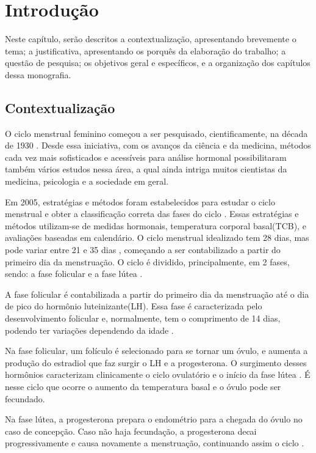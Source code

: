 \chapter[Introdução]{Introdução}
\label{ch:intro}

Neste capítulo, serão descritos a contextualização, apresentando brevemente o tema; a justificativa, 
apresentando os porquês da elaboração do trabalho; a questão de pesquisa; os objetivos geral e específicos, e a organização dos 
capítulos dessa monografia.

\section{Contextualização}

O ciclo menstrual feminino começou a ser pesquisado, cientificamente, na década de 1930 \cite{frank1931}.
Desde essa iniciativa, com os avanços da ciência e da medicina, métodos cada vez mais sofisticados e 
acessíveis para análise hormonal possibilitaram também vários estudos nessa área, a qual ainda intriga 
muitos cientistas da medicina, psicologia e a sociedade em geral.


Em 2005, estratégias e métodos foram estabelecidos para estudar o ciclo menstrual e obter a 
classificação correta das fases do ciclo \cite{becker2005}.
Essas estratégias e métodos utilizam-se de medidas hormonais, temperatura corporal basal(TCB), e 
avaliações baseadas em calendário. O ciclo menstrual idealizado tem 28 dias, mas pode variar entre 21 
e 35 dias \cite{lenton1984a}, começando a ser contabilizado a partir do primeiro dia da menstruação. 
O ciclo é dividido, principalmente, em 2 fases, sendo: a fase folicular e a fase lútea 
\cite{brondin2008}.


A fase folicular é contabilizada a partir do primeiro dia da menstruação até o dia de pico do hormônio 
luteinizante(LH). Essa fase é caracterizada pelo desenvolvimento folicular e, normalmente, tem o 
comprimento de 14 
dias, podendo ter variações dependendo da idade \cite{lenton1984a}.

Na fase folicular, um folículo é selecionado para se tornar um óvulo, e aumenta a produção do estradiol
que faz surgir o LH e a progesterona. O surgimento desses hormônios caracterizam clinicamente o ciclo 
ovulatório e o início da fase lútea \cite{fritz2010}. É nesse ciclo que ocorre o aumento da temperatura
basal e o óvulo pode ser fecundado. 


Na fase lútea, a progesterona prepara o endométrio para a chegada do óvulo no caso de concepção. 
Caso não haja fecundação, a progesterona decai progressivamente e causa novamente a menstruação, 
continuando assim o ciclo \cite{nikas2003}.


